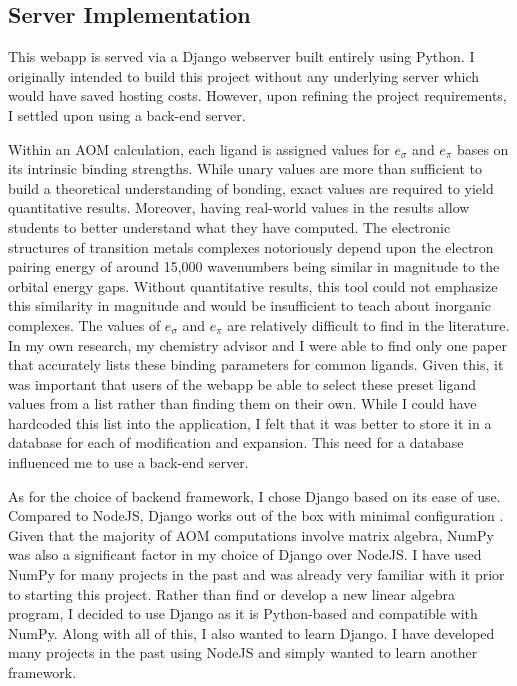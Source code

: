 \documentclass[10pt,twocolumn]{article}
\begin{document}
\subsection{Server Implementation}
This webapp is served via a Django webserver built entirely using Python. I originally intended to build this project without any underlying server which would have saved hosting costs. However, upon refining the project requirements, I settled upon using a back-end server.

Within an AOM calculation, each ligand is assigned values for $e_\sigma$ and $e_\pi$ bases on its intrinsic binding strengths. While unary values are more than sufficient to build a theoretical understanding of bonding, exact values are required to yield quantitative results. Moreover, having real-world values in the results allow students to better understand what they have computed. The electronic structures of transition metals complexes notoriously depend upon the electron pairing energy of around 15,000 wavenumbers being similar in magnitude to the orbital energy gaps. Without quantitative results, this tool could not emphasize this similarity in magnitude and would be insufficient to teach about inorganic complexes. The values of $e_\sigma$ and $e_\pi$ are relatively difficult to find in the literature. In my own research, my chemistry advisor and I were able to find only one paper that accurately lists these binding parameters for common ligands. Given this, it was important that users of the webapp be able to select these preset ligand values from a list rather than finding them on their own. While I could have hardcoded this list into the application, I felt that it was better to store it in a database for each of modification and expansion. This need for a database influenced me to use a back-end server.

As for the choice of backend framework, I chose Django based on its ease of use. Compared to NodeJS, Django works out of the box with minimal configuration \cite{django}. Given that the majority of AOM computations involve matrix algebra, NumPy was also a significant factor in my choice of Django over NodeJS. I have used NumPy for many projects in the past and was already very familiar with it prior to starting this project. Rather than find or develop a new linear algebra program, I decided to use Django as it is Python-based and compatible with NumPy. Along with all of this, I also wanted to learn Django. I have developed many projects in the past using NodeJS and simply wanted to learn another framework.
 
\end{document}

